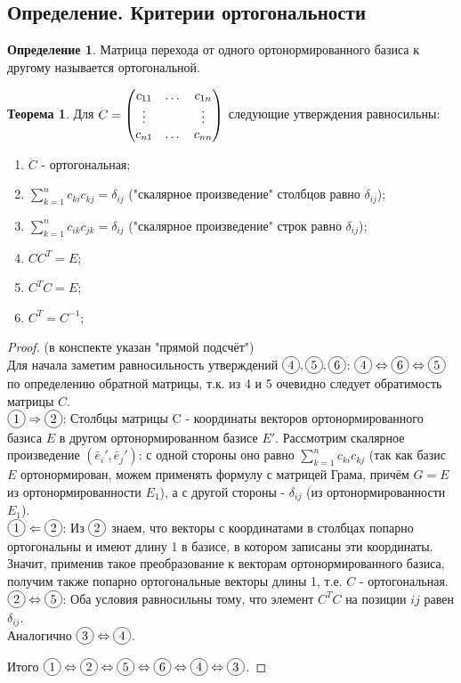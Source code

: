 \documentclass[a4paper, 12pt]{article}
\newcommand*\circled[1]{\tikz[baseline=(char.base)]{
            \node[shape=circle,draw,inner sep=2pt] (char) {#1};}}
\theoremstyle{definition}
\newtheorem*{definition}{Определение}
\newtheorem*{theorem}{Теорема}
\begin{document}
	\subsection{Определение. Критерии ортогональности}
	\begin{definition}
		Матрица перехода от одного ортонормированного базиса к другому называется ортогональной.
	\end{definition}
	\begin{theorem}
		Для $C = \begin{pmatrix} c_{11}&\dots&c_{1n} \\ \vdots&\null&\vdots \\ c_{n1}&\dots&c_{nn} \end{pmatrix}$ следующие утверждения равносильны:
		\begin{enumerate}
			\item $C$ - ортогональная;
			\item $\sum \limits_{k=1}^{n} c_{ki}c_{kj} = \delta_{ij}$ ("скалярное произведение" столбцов равно $\delta_{ij}$);
			\item $\sum \limits_{k=1}^{n} c_{ik}c_{jk} = \delta_{ij}$ ("скалярное произведение" строк равно $\delta_{ij}$);
			\item $C C^T = E$;
			\item $C^T C = E$;
			\item $C^T = C^{-1}$;
		\end{enumerate}
	\end{theorem}
	\begin{proof}(в конспекте указан "прямой подсчёт")\\
		Для начала заметим равносильность утверждений $\circled{4}, \circled{5}, \circled{6}$: $\circled{4} \Leftrightarrow \circled{6} \Leftrightarrow \circled{5}$ по определению обратной матрицы, т.к. из 4 и 5 очевидно следует обратимость матрицы $C$.\\
		$\circled{1} \Rightarrow \circled{2}$: Столбцы матрицы C - координаты векторов ортонормированного базиса $E$ в другом ортонормированном базисе $E'$. Рассмотрим скалярное произведение $(\bar{e}_{i}', \bar{e}_{j}')$: с одной стороны оно равно $\sum \limits_{k=1}^{n} c_{ki}c_{kj}$ (так как базис $E$ ортонормирован, можем применять формулу с матрицей Грама, причём $G = E$ из ортонормированности $E_{1}$), а с другой стороны - $\delta_{ij}$ (из ортонормированности $E_{1}$).\\
		$\circled{1} \Leftarrow \circled{2}$: Из $\circled{2}$ знаем, что векторы с координатами в столбцах попарно ортогональны и имеют длину 1 в базисе, в котором записаны эти координаты. Значит, применив такое преобразование к векторам ортонормированного базиса, получим также попарно ортогональные векторы длины 1, т.е. $C$ - ортогональная.\\
		$\circled{2} \Leftrightarrow \circled{5}$: Оба условия равносильны тому, что элемент $C^T C$ на позиции $ij$ равен $\delta_{ij}$.\\
		Аналогично $\circled{3} \Leftrightarrow \circled{4}$.

		Итого $\circled{1} \Leftrightarrow \circled{2} \Leftrightarrow \circled{5} \Leftrightarrow \circled{6} \Leftrightarrow \circled{4} \Leftrightarrow \circled{3}$.
	\end{proof}
\end{document}
